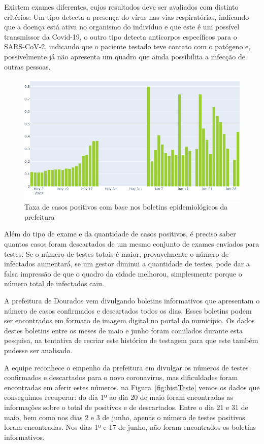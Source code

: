 \documentclass[12pt]{article}
\begin{document}
Existem exames diferentes, cujos resultados deve ser avaliados com distinto critérios: Um tipo detecta a presença do vírus nas vias respiratórias, indicando que a doença está ativa no organismo do indivíduo e que este é um possível transmissor da Covid-19, o outro tipo detecta anticorpos específicos para o SARS-CoV-2, indicando que o paciente testado teve contato com o patógeno e, possivelmente já não apresenta um quadro que ainda possibilita a infecção de outras pessoas.

\begin{figure}[!htb]
  \centering
  \includegraphics[width=.75\textwidth]{figs/taxa_positivo.png}
  \caption{Taxa de casos positivos com base nos boletins epidemiológicos da prefeitura}
  \label{fig:positTaxa}
  \end{figure}


Além do tipo de exame e da quantidade de casos positivos, é preciso saber quantos casos foram descartados de um mesmo conjunto de exames enviados para testes. Se o número de testes totais é maior, provavelmente o número de infectados aumentará, se um gestor diminui a quantidade de testes, pode dar a falsa impressão de que o quadro da cidade melhorou, simplesmente porque o número total de infectados caiu.

A prefeitura de Dourados vem divulgando boletins informativos que apresentam o número de casos confirmados e descartados todos os dias. Esses boletins podem ser encontrados em formato de imagem digital no portal do município. Os dados destes boletins entre os meses de maio e junho foram comilados durante esta pesquisa, na tentativa de recriar este histórico de testagem para que este também pudesse ser analisado.


A equipe reconhece o empenho da prefeitura em divulgar os números de testes confirmados e descartados para o novo coronavírus, mas dificuldades foram encontradas em aferir estes números. na Figura~\ref{fig:histTeste} vemos os dados que conseguimos recuperar: do dia 1º ao dia 20 de maio foram encontradas as informações sobre o total de positivos e de descartados. Entre o dia 21 e 31 de maio, bem como nos dias 2 e 3 de junho, apenas o número de testes positivos foram encontradas. Nos dias 1º e 17 de junho, não foram encontrados os boletins informativos.
\end{document}
